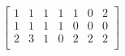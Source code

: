 \documentclass{article}
\begin{document}
 $
\left[
\begin{array}{c|c|c|c|c|c|c}
1 & 1 & 1 & 1 & 1 & 0 & 2 \\
1 & 1 & 1 & 1 & 0 & 0 & 0 \\
2 & 3 & 1 & 0 & 2 & 2 & 2 \\
\end{array}
\right] $
\end{document}
